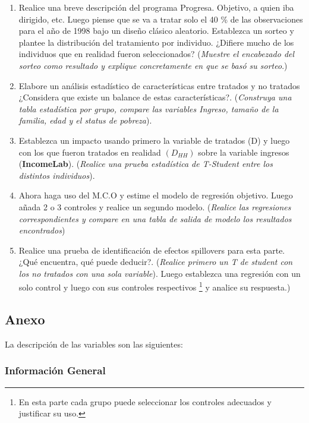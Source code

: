 \documentclass[
]{article}
\begin{document}
\begin{enumerate}
\def\labelenumi{\arabic{enumi}.}
\item
  Realice una breve descripción del programa Progresa. Objetivo, a quien
  iba dirigido, etc. Luego piense que se va a tratar solo el 40 \% de
  las observaciones para el año de 1998 bajo un diseño clásico
  aleatorio. Establezca un sorteo y plantee la distribución del
  tratamiento por individuo. ¿Difiere mucho de los individuos que en
  realidad fueron seleccionados? (\emph{Muestre el encabezado del sorteo
  como resultado y explique concretamente en que se basó su sorteo}.)
\item
  Elabore un análisis estadístico de características entre tratados y no
  tratados ¿Considera que existe un balance de estas características?.
  (\emph{Construya una tabla estadística por grupo, compare las
  variables Ingreso, tamaño de la familia, edad y el status de
  pobreza}).
\item
  Establezca un impacto usando primero la variable de tratados (D) y
  luego con los que fueron tratados en realidad \((D_{HH})\) sobre la
  variable ingresos (\textbf{IncomeLab}). (\emph{Realice una prueba
  estadística de T-Student entre los distintos individuos}).
\item
  Ahora haga uso del M.C.O y estime el modelo de regresión objetivo.
  Luego añada 2 o 3 controles y realice un segundo modelo.
  (\emph{Realice las regresiones correspondientes y compare en una tabla
  de salida de modelo los resultados encontrados})
\item
  Realice una prueba de identificación de efectos spillovers para esta
  parte. ¿Qué encuentra, qué puede deducir?. (\emph{Realice primero un T
  de student con los no tratados con una sola variable}). Luego
  establezca una regresión con un solo control y luego con sus controles
  respectivos
  \footnote{En esta parte cada grupo puede seleccionar los controles adecuados y justificar su uso.}
  y analice su respuesta.)
\end{enumerate}

\newpage

\subsection{Anexo}\label{anexo}

La descripción de las variables son las siguientes:

\subsubsection{Información General}\label{informaciuxf3n-general}
\end{document}
